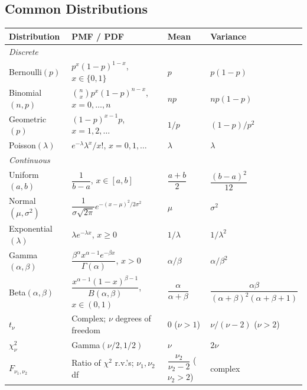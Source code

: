 \documentclass[oneside]{book}
\begin{document}
\subsection*{Common Distributions}

\begin{center}
\begin{longtable}{llll}
\toprule
\textbf{Distribution} & \textbf{PMF / PDF} & \textbf{Mean} & \textbf{Variance} \\
\midrule
\endhead
\multicolumn{4}{l}{\textit{Discrete}} \\
\midrule
Bernoulli$(p)$   & $p^x(1-p)^{1-x}$, $x\in\{0,1\}$                     & $p$       & $p(1-p)$ \\
Binomial$(n,p)$  & $\binom{n}{x}p^x(1-p)^{n-x}$, $x=0,\ldots,n$        & $np$      & $np(1-p)$ \\
Geometric$(p)$   & $(1-p)^{x-1}p$, $x=1,2,\ldots$                       & $1/p$     & $(1-p)/p^2$ \\
Poisson$(\lambda)$ & $e^{-\lambda}\lambda^x/x!$, $x=0,1,\ldots$         & $\lambda$ & $\lambda$ \\
\midrule
\multicolumn{4}{l}{\textit{Continuous}} \\
\midrule
Uniform$(a,b)$   & $\dfrac{1}{b-a}$, $x\in[a,b]$                        & $\dfrac{a+b}{2}$ & $\dfrac{(b-a)^2}{12}$ \\[6pt]
Normal$(\mu,\sigma^2)$ & $\dfrac{1}{\sigma\sqrt{2\pi}}e^{-(x-\mu)^2/2\sigma^2}$ & $\mu$ & $\sigma^2$ \\[6pt]
Exponential$(\lambda)$ & $\lambda e^{-\lambda x}$, $x\geq 0$            & $1/\lambda$ & $1/\lambda^2$ \\[6pt]
Gamma$(\alpha,\beta)$ & $\dfrac{\beta^\alpha x^{\alpha-1}e^{-\beta x}}{\Gamma(\alpha)}$, $x>0$ & $\alpha/\beta$ & $\alpha/\beta^2$ \\[6pt]
Beta$(\alpha,\beta)$ & $\dfrac{x^{\alpha-1}(1-x)^{\beta-1}}{B(\alpha,\beta)}$, $x\in(0,1)$ & $\dfrac{\alpha}{\alpha+\beta}$ & $\dfrac{\alpha\beta}{(\alpha+\beta)^2(\alpha+\beta+1)}$ \\[6pt]
$t_\nu$          & Complex; $\nu$ degrees of freedom                     & $0$ ($\nu>1$) & $\nu/(\nu-2)$ ($\nu>2$) \\[4pt]
$\chi^2_\nu$     & Gamma$(\nu/2, 1/2)$                                   & $\nu$     & $2\nu$ \\[4pt]
$F_{\nu_1,\nu_2}$ & Ratio of $\chi^2$ r.v.'s; $\nu_1,\nu_2$ df         & $\dfrac{\nu_2}{\nu_2-2}$ ($\nu_2>2$) & \small complex \\
\bottomrule
\end{longtable}
\end{center}
\end{document}
